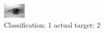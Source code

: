 \begin{figure}[h!]
\begin{center}
\includegraphics[width=0.60\columnwidth]{figures/ID374_class_1_target_2.png}
\end{center}
\caption{ Classification: 1 actual target: 2}
\label{fig:ID374_class_1_target_2}
\end{figure}
